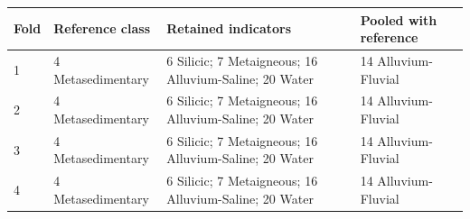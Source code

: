 \begin{tabular}{llll}
\toprule
Fold & Reference class & Retained indicators & Pooled with reference \\
\midrule
1 & 4 Metasedimentary & 6 Silicic; 7 Metaigneous; 16 Alluvium-Saline; 20 Water & 14 Alluvium-Fluvial \\
2 & 4 Metasedimentary & 6 Silicic; 7 Metaigneous; 16 Alluvium-Saline; 20 Water & 14 Alluvium-Fluvial \\
3 & 4 Metasedimentary & 6 Silicic; 7 Metaigneous; 16 Alluvium-Saline; 20 Water & 14 Alluvium-Fluvial \\
4 & 4 Metasedimentary & 6 Silicic; 7 Metaigneous; 16 Alluvium-Saline; 20 Water & 14 Alluvium-Fluvial \\
\bottomrule
\end{tabular}

